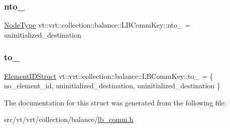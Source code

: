 \subsubsection{\texorpdfstring{nto\+\_\+}{nto\_}}
{\footnotesize\ttfamily \hyperlink{namespacevt_a866da9d0efc19c0a1ce79e9e492f47e2}{Node\+Type} vt\+::vrt\+::collection\+::balance\+::\+L\+B\+Comm\+Key\+::nto\+\_\+ = uninitialized\+\_\+destination}

\mbox{\label{structvt_1_1vrt_1_1collection_1_1balance_1_1_l_b_comm_key_a878217deed946f498627af5b7740400c}} 
\subsubsection{\texorpdfstring{to\+\_\+}{to\_}}
{\footnotesize\ttfamily \hyperlink{structvt_1_1vrt_1_1collection_1_1balance_1_1_element_i_d_struct}{Element\+I\+D\+Struct} vt\+::vrt\+::collection\+::balance\+::\+L\+B\+Comm\+Key\+::to\+\_\+ = \{ no\+\_\+element\+\_\+id, uninitialized\+\_\+destination, uninitialized\+\_\+destination \}}



The documentation for this struct was generated from the following file\+:\begin{DoxyCompactItemize}
\item 
src/vt/vrt/collection/balance/\hyperlink{lb__comm_8h}{lb\+\_\+comm.\+h}\end{DoxyCompactItemize}
